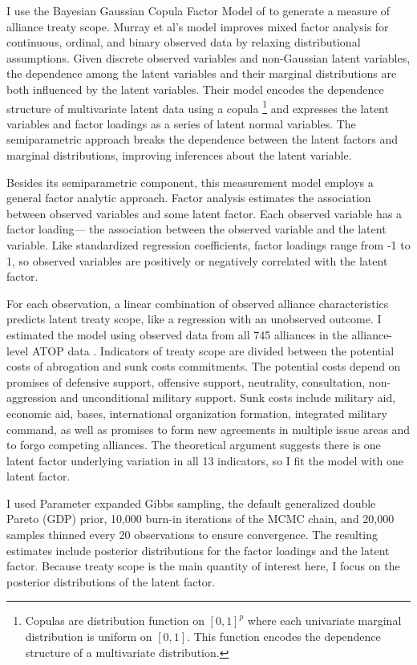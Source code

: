 \documentclass[12pt]{article}
\begin{document}
I use the Bayesian Gaussian Copula Factor Model of \citet{Murrayetal2013} to generate a measure of alliance treaty scope. 
Murray et al's model improves mixed factor analysis for continuous, ordinal, and binary observed data by relaxing distributional assumptions. 
Given discrete observed variables and non-Gaussian latent variables, the dependence among the latent variables and their marginal distributions are both influenced by the latent variables.
Their model encodes the dependence structure of multivariate latent data using a copula
\footnote{Copulas are distribution function on $[0, 1]^p$ where each univariate marginal distribution is uniform on $[0,1]$. This function encodes the dependence structure of a multivariate distribution.} 
and expresses the latent variables and factor loadings as a series of latent normal variables. 
The semiparametric approach breaks the dependence between the latent factors and marginal distributions, improving inferences about the latent variable. 


Besides its semiparametric component, this measurement model employs a general factor analytic approach.
Factor analysis estimates the association between observed variables and some latent factor.
Each observed variable has a factor loading--- the association between the observed variable and the latent variable.  
Like standardized regression coefficients, factor loadings range from -1 to 1, so observed variables are positively or negatively correlated with the latent factor.  


For each observation, a linear combination of observed alliance characteristics predicts latent treaty scope, like a regression with an unobserved outcome.  
I estimated the model using observed data from all 745 alliances in the alliance-level ATOP data \citep{Leedsetal2002}. 
Indicators of treaty scope are divided between the potential costs of abrogation and sunk costs commitments.
The potential costs depend on promises of defensive support, offensive support, neutrality, consultation, non-aggression and unconditional military support. 
Sunk costs include military aid, economic aid, bases, international organization formation, integrated military command, as well as promises to form new agreements in multiple issue areas and to forgo competing alliances. 
The theoretical argument suggests there is one latent factor underlying variation in all 13 indicators, so I fit the model with one latent factor. 


I used Parameter expanded Gibbs sampling, the default generalized double Pareto (GDP) prior, 10,000 burn-in iterations of the MCMC chain, and 20,000 samples thinned every 20 observations to ensure convergence. 
The resulting estimates include posterior distributions for the factor loadings and the latent factor. 
Because treaty scope is the main quantity of interest here, I focus on the posterior distributions of the latent factor. 
\end{document}
